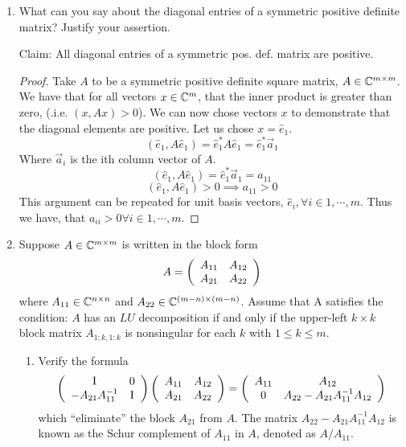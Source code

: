 \documentclass{article}
\begin{document}
\begin{enumerate}
\item   %
What can you say about the diagonal entries of a symmetric positive definite matrix? Justify your assertion.

Claim: All diagonal entries of a symmetric pos. def. matrix are positive. 

\begin{proof}
    Take $A$ to be a symmetric positive definite square matrix, $A \in \mathbb{C}^{m\times m}$. We have that for all vectors $x \in \mathbb{C}^m$, that the inner product is greater than zero, (.i.e. $(x, Ax) > 0$). We can now chose vectors $x$ to demonstrate that the diagonal elements are positive. Let us chose $x = \hat{e}_1$.
\[
    (\hat{e}_1, A\hat{e}_1) = \hat{e}_1^*A\hat{e}_1 = \hat{e}_1^*\vec{a}_1
\]
Where $\vec{a}_i$ is the ith column vector of $A$. 
\[
    (\hat{e}_1, A\hat{e}_1) = \hat{e}_1^*\vec{a}_1 = a_{11} 
\]
\[
      (\hat{e}_1, A\hat{e}_1) > 0 \implies a_{11} > 0
\]
This argument can be repeated for unit basis vectors, $\hat{e}_i, \forall i \in 1, \cdots, m$. Thus we have, that $a_{ii} > 0 \forall i \in 1, \cdots, m$.
\end{proof}


\item Suppose $A \in \mathbb{C}^{m \times m}$ is written in the block form
\[
A = \left(\begin{array}{c c}
        A_{11} & A_{12}\\
        A_{21} & A_{22}
    \end{array}\right)
\]
where $A_{11} \in \mathbb{C}^{n\times n}$ and $A_{22} \in \mathbb{C}^{(m-n)\times(m-n)}$. Assume that A satisfies the condition: $A$ has an $LU$ decomposition if and only if the upper-left $k\times k$ block matrix $A_{1:k,1:k}$ is nonsingular for each $k$ with $1 \le k \le m$.
\begin{enumerate}
\item Verify the formula
\[
 \left(\begin{array}{c c}
        \mathrm{I} & 0\\
        -A_{21}A_{11}^{-1} & \mathrm{I}
    \end{array}\right)
 \left(\begin{array}{c c}
        A_{11} & A_{12}\\
        A_{21} & A_{22}
    \end{array}\right) =  \left(\begin{array}{c c}
        A_{11} & A_{12}\\
        0 & A_{22} - A_{21}A_{11}^{-1}A_{12}
    \end{array}\right)
\]
which “eliminate” the block $A_{21}$ from $A$. The matrix $A_{22}-A_{21}A_{11}^{-1}A_{12}$ is known as the Schur complement of $A_{11}$ in $A$, denoted as $A/A_{11}$.


\end{enumerate}
\end{enumerate}
\end{document}
